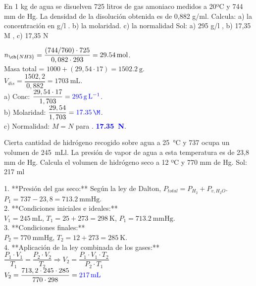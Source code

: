 \begin{exercise}
    En 1 kg de agua se disuelven 725 litros de gas amoniaco medidos a 20ºC y 744 mm de Hg. La densidad de la disolución obtenida es de 0,882 g/ml. Calcula: a) la concentración en g/l . b) la molaridad. c) la normalidad
    Sol: a) 295 g/l  ,   b) 17,35 M   ,   c) 17,35 N
    \begin{solu}
        $n_{\ch{NH3}} = \dfrac{(744/760) \cdot 725}{0,082 \cdot 293} = \qty{29,54}{\mol}$. \\
        Masa total = $1000 + (29,54 \cdot 17) = \qty{1502,2}{\g}$. \\
        $V_{dis} = \dfrac{1502,2}{0,882} = \qty{1703}{\mL}$. \\
        a) Conc: $\dfrac{29,54 \cdot 17}{1,703} = \mathbf{\textcolor{blue}{\qty{295}{\g\per\L}}}$. \\
        b) Molaridad: $\dfrac{29,54}{1,703} = \mathbf{\textcolor{blue}{\qty{17,35}{\M}}}$. \\
        c) Normalidad: $M=N$ para . \textbf{\textcolor{blue}{\qty{17,35}{\N}}}.
    \end{solu}
\end{exercise}

\begin{exercise}
    Cierta cantidad de hidrógeno recogido sobre agua a \qty{25}{\celsius} y \qty{737}{\mmhg} ocupa un volumen de \qty{245}{\mL}l. La presión de vapor de agua a esta temperatura es de 23,8 mm de Hg. Calcula el volumen de hidrógeno seco a 12 ºC y 770 mm de Hg. Sol: 217 ml
    \begin{solu}
        1. **Presión del gas seco:** Según la ley de Dalton, \( P_{total} = P_{H_2} + P_{v,H_2O} \). \\
        \( P_1 = 737 - 23,8 = \qty{713,2}{\mmHg} \). \\
        2. **Condiciones iniciales e ideales:** \\
        \( V_1 = \qty{245}{\mL} \), \( T_1 = 25 + 273 = \qty{298}{\K} \), \( P_1 = \qty{713,2}{\mmHg} \). \\
        3. **Condiciones finales:** \\
        \( P_2 = \qty{770}{\mmHg} \), \( T_2 = 12 + 273 = \qty{285}{\K} \). \\
        4. **Aplicación de la ley combinada de los gases:** \\
        \( \dfrac{P_1 \cdot V_1}{T_1} = \dfrac{P_2 \cdot V_2}{T_2} \Rightarrow V_2 = \dfrac{P_1 \cdot V_1 \cdot T_2}{P_2 \cdot T_1} \) \\
        \( V_2 = \dfrac{713,2 \cdot 245 \cdot 285}{770 \cdot 298} = \mathbf{\textcolor{blue}{\qty{217}{\mL}}} \)
    \end{solu}
\end{exercise}

